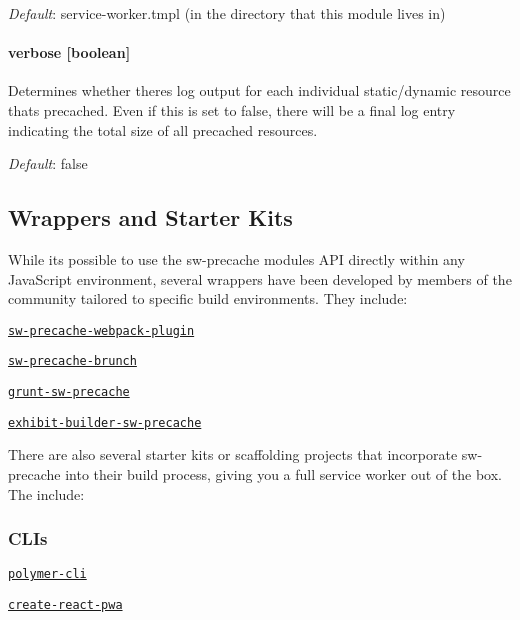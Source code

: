 {\itshape Default}\+: {\ttfamily service-\/worker.\+tmpl} (in the directory that this module lives in)

\paragraph*{verbose \mbox{[}boolean\mbox{]}}

Determines whether there\textquotesingle{}s log output for each individual static/dynamic resource that\textquotesingle{}s precached. Even if this is set to false, there will be a final log entry indicating the total size of all precached resources.

{\itshape Default}\+: {\ttfamily false}

\subsection*{Wrappers and Starter Kits}

While it\textquotesingle{}s possible to use the {\ttfamily sw-\/precache} module\textquotesingle{}s A\+PI directly within any Java\+Script environment, several wrappers have been developed by members of the community tailored to specific build environments. They include\+:
\begin{DoxyItemize}
\item \href{https://www.npmjs.com/package/sw-precache-webpack-plugin}{\tt {\ttfamily sw-\/precache-\/webpack-\/plugin}}
\item \href{https://www.npmjs.com/package/sw-precache-brunch}{\tt {\ttfamily sw-\/precache-\/brunch}}
\item \href{https://www.npmjs.com/package/grunt-sw-precache}{\tt {\ttfamily grunt-\/sw-\/precache}}
\item \href{https://www.npmjs.com/package/exhibit-builder-sw-precache}{\tt {\ttfamily exhibit-\/builder-\/sw-\/precache}}
\end{DoxyItemize}

There are also several starter kits or scaffolding projects that incorporate {\ttfamily sw-\/precache} into their build process, giving you a full service worker out of the box. The include\+:

\subsubsection*{C\+L\+Is}


\begin{DoxyItemize}
\item \href{https://github.com/Polymer/polymer-cli}{\tt {\ttfamily polymer-\/cli}}
\item \href{https://github.com/jeffposnick/create-react-pwa}{\tt {\ttfamily create-\/react-\/pwa}}
\end{DoxyItemize}

